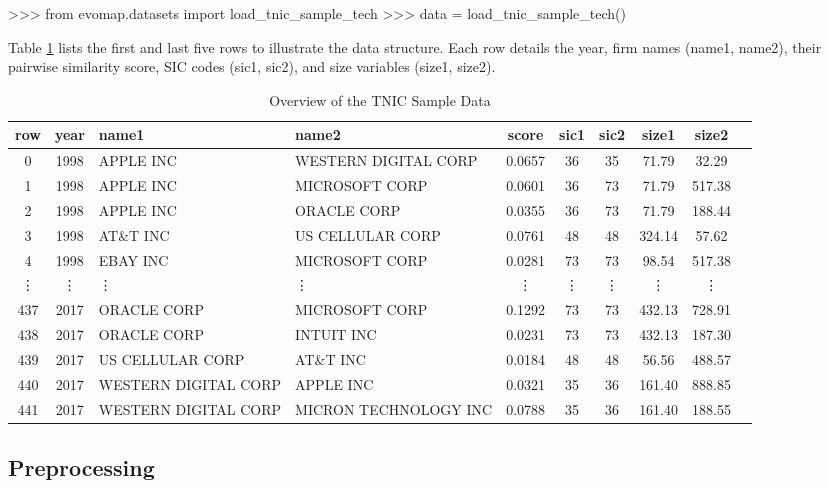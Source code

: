 \documentclass[article]{jss}
\begin{document}
\begin{Code}
>>> from evomap.datasets import load_tnic_sample_tech
>>> data = load_tnic_sample_tech()
\end{Code}

Table \ref{tab:data-overview} lists the first and last five rows to illustrate the data structure. 
Each row details the year, firm names (name1, name2), their pairwise similarity score, SIC codes (sic1, sic2), and size
 variables (size1, size2).

\begin{table}[t!]
  \centering
  \begin{tabular}{ccp{3cm}p{3cm}cccccc}
  \hline
  row & year & name1 & name2 & score & sic1 & sic2 & size1 & size2 \\ 
  \hline
  0 & 1998 & APPLE INC & WESTERN DIGITAL CORP & 0.0657 & 36 & 35 & 71.79 & 32.29 \\
  1 & 1998 & APPLE INC & MICROSOFT CORP & 0.0601 & 36 & 73 & 71.79 & 517.38 \\
  2 & 1998 & APPLE INC & ORACLE CORP & 0.0355 & 36 & 73 & 71.79 & 188.44 \\
  3 & 1998 & AT\&T INC & US CELLULAR CORP & 0.0761 & 48 & 48 & 324.14 & 57.62 \\
  4 & 1998 & EBAY INC & MICROSOFT CORP & 0.0281 & 73 & 73 & 98.54 & 517.38 \\
  \vdots & \vdots & \vdots & \vdots & \vdots & \vdots & \vdots & \vdots & \vdots \\
  437 & 2017 & ORACLE CORP & MICROSOFT CORP & 0.1292 & 73 & 73 & 432.13 & 728.91 \\
  438 & 2017 & ORACLE CORP & INTUIT INC & 0.0231 & 73 & 73 & 432.13 & 187.30 \\
  439 & 2017 & US CELLULAR CORP & AT\&T INC & 0.0184 & 48 & 48 & 56.56 & 488.57 \\
  440 & 2017 & WESTERN DIGITAL CORP & APPLE INC & 0.0321 & 35 & 36 & 161.40 & 888.85 \\
  441 & 2017 & WESTERN DIGITAL CORP & MICRON TECHNOLOGY INC & 0.0788 & 35 & 36 & 161.40 & 188.55 \\
  \hline
  \end{tabular}
  \caption{Overview of the TNIC Sample Data} \label{tab:data-overview}
\end{table}
  
\subsection{Preprocessing}
\end{document}
